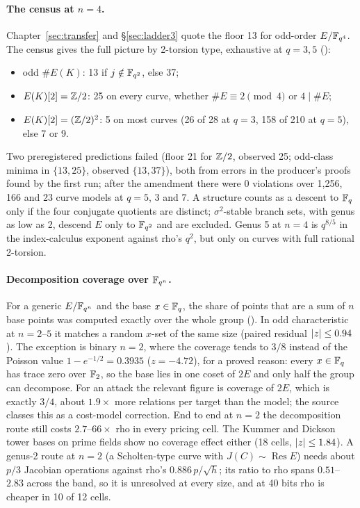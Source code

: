 \paragraph{The census at $n=4$.} Chapter~\ref{sec:transfer} and
\S\ref{sec:ladder3} quote the floor 13 for odd-order $E/\mathbb{F}_{q^4}$. The
census gives the full picture by 2-torsion type, exhaustive at $q=3,5$
():
\begin{itemize}
\item odd $\#E(K)$: 13 if $j\notin\mathbb{F}_{q^2}$, else 37;
\item $E(K)[2]=\mathbb{Z}/2$: 25 on every curve, whether $\#E\equiv2\pmod4$ or
  $4\mid\#E$;
\item $E(K)[2]=(\mathbb{Z}/2)^2$: 5 on most curves (26 of 28 at $q=3$, 158 of 210 at
  $q=5$), else 7 or 9.
\end{itemize}
Two preregistered predictions failed (floor 21 for $\mathbb{Z}/2$, observed 25;
odd-class minima in $\{13,25\}$, observed $\{13,37\}$), both from errors in
the producer's proofs found by the first run; after the amendment there were
0 violations over 1{,}256, 166 and 23 curve models at $q=5$, 3 and 7. A
structure counts as a descent to $\mathbb{F}_q$ only if the four conjugate quotients
are distinct; $\sigma^2$-stable branch sets, with genus as low as 2, descend
$E$ only to $\mathbb{F}_{q^2}$ and are excluded. Genus 5 at $n=4$ is $q^{8/5}$ in the
index-calculus exponent against rho's $q^2$, but only on curves with full
rational 2-torsion.

\paragraph{Decomposition coverage over $\mathbb{F}_{q^n}$.} For a generic
$E/\mathbb{F}_{q^n}$ and the base $x\in\mathbb{F}_q$, the share of points that are a sum of
$n$ base points was computed exactly over the whole group
(). In odd
characteristic at $n=2$--$5$ it matches a random $x$-set of the same size
(paired residual $\lvert z \rvert\le0.94$). The exception is binary $n=2$, where the
coverage tends to $3/8$ instead of the Poisson value $1-e^{-1/2}=0.3935$
($z=-4.72$), for a proved reason: every $x\in\mathbb{F}_q$ has trace zero over
$\mathbb{F}_2$, so the base lies in one coset of $2E$ and only half the group can
decompose. For an attack the relevant figure is coverage of $2E$, which is
exactly $3/4$, about $1.9\times$ more relations per target than the model;
the source classes this as a cost-model correction. End to end at $n=2$ the
decomposition route still costs $2.7$--$66\times$ rho in every pricing
cell. The Kummer and Dickson tower bases on prime fields show no coverage
effect either (18 cells, $\lvert z \rvert\le1.84$). A genus-2 route at $n=2$ (a
Scholten-type curve with $J(C)\sim\operatorname{Res}E$) needs about $p/3$
Jacobian operations against rho's $0.886\,p/\sqrt h$; its ratio to rho spans
$0.51$--$2.83$ across the band, so it is unresolved at every size, and at
40 bits rho is cheaper in 10 of 12 cells.

